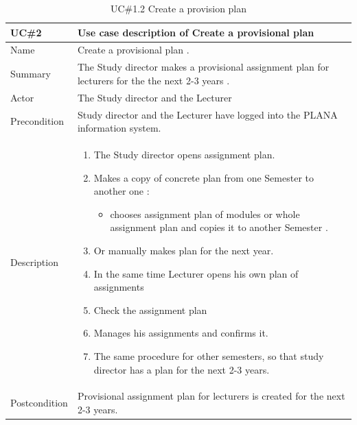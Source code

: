 \documentclass{scrartcl}
\begin{document}
  \begin{table}[H]
\begin{center}
\begin{tabular}{| p{2.5cm}| p{12.5cm} |}
\hline
\textbf{UC\#2 } & \textbf{Use case description of Create a provisional plan} \\
\hline
Name  &  Create a provisional plan .\\ \hline
	         Summary  &The Study director makes a provisional assignment plan for  lecturers for the the next 2-3 years . \\ \hline
	         Actor   &The Study director  and the Lecturer \\ \hline
	         Precondition & Study director and the Lecturer have logged into the PLANA information system. \\ \hline
	         Description & 
	         \begin{enumerate}
	   		\item The Study director opens assignment plan.
			\item Makes a copy of concrete plan from one Semester to another one  :
			       \begin{itemize}
			       \item chooses assignment plan of modules or whole assignment plan and copies it to another Semester .
			   
			       \end{itemize}
			\item Or manually makes  plan for the next year.    
			\item  In the same time Lecturer opens his own plan of assignments 
			\item  Check the assignment plan 
			\item Manages his assignments and confirms it.
			
			\item The same procedure for other semesters, so that study director has a plan for the next 2-3 years.
			\end{enumerate}
	             \\ \hline	        
	          Postcondition &   Provisional assignment plan for lecturers is created for the next 2-3 years.  \\ \hline
\end{tabular}
\end{center}
\caption{ UC\#1.2 Create a provision plan}
\label{table2}
\end{table}	          
	          
\end{document}
